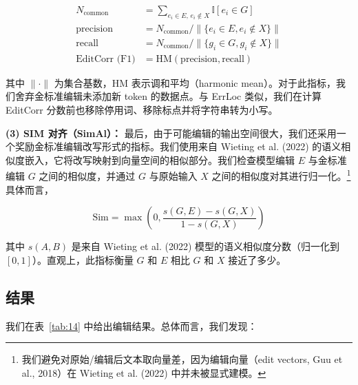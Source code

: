 \documentclass[11pt,UTF8,fontset=fandol]{ctexart}
\providecommand{\indi}{\mathbb{I}}
\begin{document}
\begin{align*}
N_{\text{common}} &= \sum_{e_i \in E,\, e_i \notin X} \indi[e_i \in G] \\
\text{precision} &= N_{\text{common}} / \|\{e_i \in E, e_i \notin X\}\| \\
\text{recall} &= N_{\text{common}} / \|\{g_i \in G, g_i \notin X\}\| \\
\text{EditCorr (F1)} &= \text{HM}(\text{precision}, \text{recall})
\end{align*}

其中 $\|\cdot\|$ 为集合基数，HM 表示调和平均（harmonic mean）。对于此指标，我们舍弃金标准编辑未添加新 token 的数据点。与 ErrLoc 类似，我们在计算 EditCorr 分数前也移除停用词、移除标点并将字符串转为小写。

\textbf{(3) SIM 对齐（SimAl）：} 最后，由于可能编辑的输出空间很大，我们还采用一个奖励金标准编辑改写形式的指标。我们使用来自 Wieting et al. (2022) 的语义相似度嵌入，它将改写映射到向量空间的相似部分。我们检查模型编辑 $E$ 与金标准编辑 $G$ 之间的相似度，并通过 $G$ 与原始输入 $X$ 之间的相似度对其进行归一化。\footnote{我们避免对原始/编辑后文本取向量差，因为编辑向量（edit vectors, Guu et al., 2018）在 Wieting et al. (2022) 中并未被显式建模。}具体而言，

\[
\text{Sim} = \max\left(0, \frac{s(G, E) - s(G, X)}{1 - s(G, X)}\right)
\]

其中 $s(A, B)$ 是来自 Wieting et al. (2022) 模型的语义相似度分数（归一化到 $[0, 1]$）。直观上，此指标衡量 $G$ 和 $E$ 相比 $G$ 和 $X$ 接近了多少。

\subsection{结果}

我们在表~\ref{tab:14} 中给出编辑结果。总体而言，我们发现：
\end{document}
